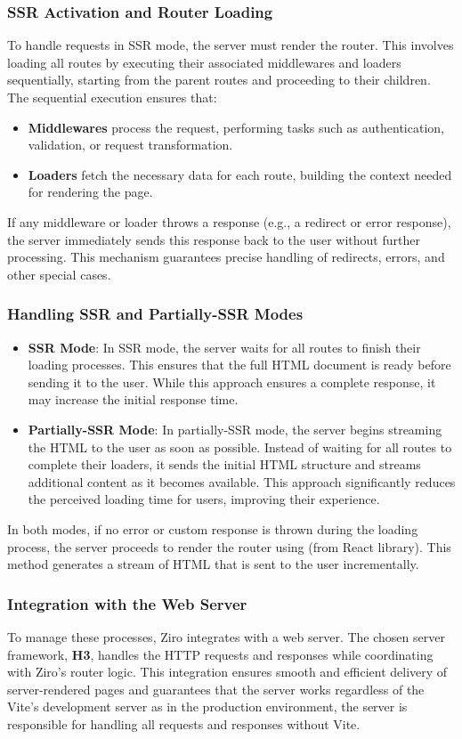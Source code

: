 \subsubsection{SSR Activation and Router Loading}
To handle requests in SSR mode, the server must render the router. This involves loading all routes by executing their associated middlewares and loaders sequentially, starting from the parent routes and proceeding to their children. The sequential execution ensures that:
\begin{itemize}
  \item \textbf{Middlewares} process the request, performing tasks such as authentication, validation, or request transformation.
  \item \textbf{Loaders} fetch the necessary data for each route, building the context needed for rendering the page.
\end{itemize}
If any middleware or loader throws a response (e.g., a redirect or error response), the server immediately sends this response back to the user without further processing. This mechanism guarantees precise handling of redirects, errors, and other special cases.

\subsubsection{Handling SSR and Partially-SSR Modes}
\begin{itemize}
  \item \textbf{SSR Mode}: In SSR mode, the server waits for all routes to finish their loading processes. This ensures that the full HTML document is ready before sending it to the user. While this approach ensures a complete response, it may increase the initial response time.
  \item \textbf{Partially-SSR Mode}: In partially-SSR mode, the server begins streaming the HTML to the user as soon as possible. Instead of waiting for all routes to complete their loaders, it sends the initial HTML structure and streams additional content as it becomes available. This approach significantly reduces the perceived loading time for users, improving their experience.
\end{itemize}
In both modes, if no error or custom response is thrown during the loading process, the server proceeds to render the router using  (from React library). This method generates a stream of HTML that is sent to the user incrementally.

\subsubsection{Integration with the Web Server}
To manage these processes, Ziro integrates with a web server. The chosen server framework, \textbf{H3}, handles the HTTP requests and responses while coordinating with Ziro’s router logic. This integration ensures smooth and efficient delivery of server-rendered pages and guarantees that the server works regardless of the Vite's development server as in the production environment, the server is responsible for handling all requests and responses without Vite.

